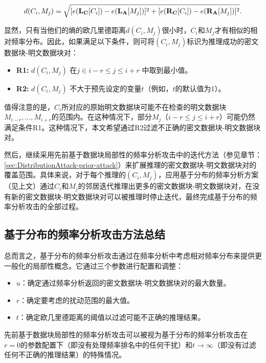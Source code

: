 \begin{equation}
    \label{eq:dis-dcm}
    \centering
    d(C_i, M_j) = \sqrt{[e(\mathbf{L_C}[C_i]) - e(\mathbf{L_A}[M_j])]^2 + [e(\mathbf{R_C}[C_i]) - e(\mathbf{R_A}[M_j])]^2}.
\end{equation}

显然，只有当他们的熵的欧几里德距离$d(C_i, M_j)$很小时，$C_i$和$M_j$才有相似的相对频率分布。因此，如果满足以下条件，则可将$(C_i, M_j)$标识为推理成功的密文数据块-明文数据块对：

\begin{itemize}
\item \textbf{R1:} $d(C_i, M_j)$ 在$j \in i-r \leq j \leq i+r$ 中取到最小值。
\item \textbf{R2:} $d(C_i, M_j)$ 不大于预先设定的变量$t$（例如，$t$的默认值为1）。
\end{itemize}

值得注意的是，$C_i$所对应的原始明文数据块可能不在检查的明文数据块$M_{i-r}, \ldots, M_{i+r}$的范围内。在这种情况下，部分$M_j$（$i-r \leq j \leq i+r$）可能仍然满足条件R1。这种情况下，本文希望通过R2过滤不正确的密文数据块-明文数据块对。 

然后，继续采用先前基于数据块局部性的频率分析攻击中的迭代方法（参见章节：\ref{sec:DistributionAttack-prior-attack}）来扩展推理的密文数据块-明文数据块对的覆盖范围。具体来说，对于每个推理的$(C_i, M_j)$，应用基于分布的频率分析方案（见上文）通过$C_i$和$M_j$的邻居迭代推理出更多的密文数据块-明文数据块对，在没有新的密文数据块-明文数据块对可以被推理时停止迭代，最终完成基于分布的频率分析攻击的全部过程。
 
\subsection{基于分布的频率分析攻击方法总结} 

总而言之，基于分布的频率分析攻击通过在频率分析中考虑相对频率分布来提供更一般化的局部性概念。它通过三个参数进行配置和调整：

\begin{itemize}
    \item $u$：确定通过频率分析返回的密文数据块-明文数据块对的最大数量。
    \item $r$：确定要考虑的扰动范围的最大值。
    \item $t$：确定欧几里德距离的阈值以过滤可能不正确的推理结果。 
\end{itemize}


先前基于数据块局部性的频率分析攻击可以被视为基于分布的频率分析攻击在$r=0$的参数配置下（即没有处理频率排名中的任何干扰）和$t \rightarrow \infty$（即没有过滤任何不正确的推理结果）的特殊情况。

